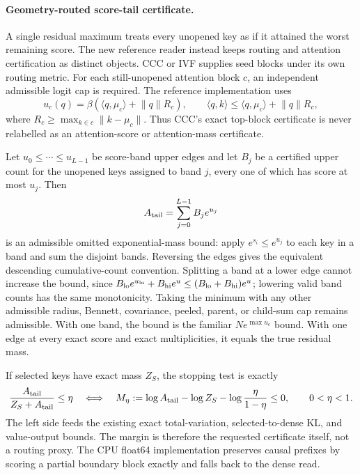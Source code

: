 \documentclass[11pt]{article}
\numberwithin{equation}{section}
\newcommand{\inner}[2]{\langle #1, #2\rangle}
\begin{document}
\paragraph{Geometry-routed score-tail certificate.}
A single residual maximum treats every unopened key as if it attained the worst remaining score. The new
reference reader instead keeps routing and attention certification as distinct objects. CCC or IVF supplies
seed blocks under its own routing metric. For each still-unopened attention block $c$, an independent
admissible logit cap is required. The reference implementation uses
\begin{equation}\label{eq:attention-block-cap}
u_c(q)=\beta\left(\inner{q}{\mu_c}+\lVert q\rVert R_c\right),
\qquad
\inner{q}{k}\le \inner{q}{\mu_c}+\lVert q\rVert R_c,
\end{equation}
where $R_c\ge\max_{k\in c}\lVert k-\mu_c\rVert$. Thus CCC's exact top-block certificate is never
relabelled as an attention-score or attention-mass certificate.

Let $u_0\le\cdots\le u_{L-1}$ be score-band upper edges and let $B_j$ be a certified upper count for the
unopened keys assigned to band $j$, every one of which has score at most $u_j$. Then
\begin{equation}\label{eq:score-tail-mass}
A_{\rm tail}=\sum_{j=0}^{L-1} B_j e^{u_j}
\end{equation}
is an admissible omitted exponential-mass bound: apply $e^{s_i}\le e^{u_j}$ to each key in a band and sum
the disjoint bands. Reversing the edges gives the equivalent descending cumulative-count convention. Splitting
a band at a lower edge cannot increase the bound, since
$B_{\rm lo}e^{u_{\rm lo}}+B_{\rm hi}e^u\le(B_{\rm lo}+B_{\rm hi})e^u$; lowering valid band counts has the
same monotonicity. Taking the minimum with any other admissible radius, Bennett, covariance, peeled, parent,
or child-sum cap remains admissible. With one band, the bound is the familiar
$N e^{\max u_c}$ bound. With one edge at every exact score and exact multiplicities, it equals the true
residual mass.

If selected keys have exact mass $Z_S$, the stopping test is exactly
\begin{equation}\label{eq:tail-margin}
\frac{A_{\rm tail}}{Z_S+A_{\rm tail}}\le\eta
\quad\Longleftrightarrow\quad
M_\eta:=\log A_{\rm tail}-\log Z_S-\log\frac{\eta}{1-\eta}\le0,
\qquad 0<\eta<1.
\end{equation}
The left side feeds the existing exact total-variation, selected-to-dense KL, and value-output bounds. The
margin is therefore the requested certificate itself, not a routing proxy. The CPU float64 implementation
preserves causal prefixes by scoring a partial boundary block exactly and falls back to the dense read.
\end{document}
